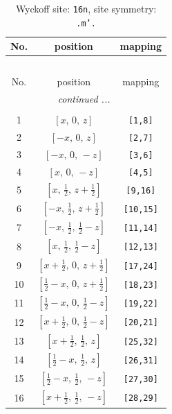 \documentclass[fleqn,8pt]{jsarticle}
\begin{document}
\renewcommand{\arraystretch}{1.2}
\begin{longtable}{ccc}
\caption{Wyckoff site: {\tt 16n}, site symmetry: {\tt .m'.}}
 \\
 \hline \hline
No. & position & mapping \\ \hline \endfirsthead

\multicolumn{2}{l}{\tablename\ \thetable{}} \\
 \hline \hline
No. & position & mapping \\ \hline \endhead

 \hline \hline
\multicolumn{2}{r}{\footnotesize\it continued ...} \\ \endfoot

 \hline \hline
\multicolumn{2}{r}{} \\ \endlastfoot

1 & $\left[ x,\, 0,\, z \right]$ & {\tt [1,8]} \\ \hline
2 & $\left[ - x,\, 0,\, z \right]$ & {\tt [2,7]} \\ \hline
3 & $\left[ - x,\, 0,\, - z \right]$ & {\tt [3,6]} \\ \hline
4 & $\left[ x,\, 0,\, - z \right]$ & {\tt [4,5]} \\ \hline
5 & $\left[ x,\, \frac{1}{2},\, z + \frac{1}{2} \right]$ & {\tt [9,16]} \\ \hline
6 & $\left[ - x,\, \frac{1}{2},\, z + \frac{1}{2} \right]$ & {\tt [10,15]} \\ \hline
7 & $\left[ - x,\, \frac{1}{2},\, \frac{1}{2} - z \right]$ & {\tt [11,14]} \\ \hline
8 & $\left[ x,\, \frac{1}{2},\, \frac{1}{2} - z \right]$ & {\tt [12,13]} \\ \hline
9 & $\left[ x + \frac{1}{2},\, 0,\, z + \frac{1}{2} \right]$ & {\tt [17,24]} \\ \hline
10 & $\left[ \frac{1}{2} - x,\, 0,\, z + \frac{1}{2} \right]$ & {\tt [18,23]} \\ \hline
11 & $\left[ \frac{1}{2} - x,\, 0,\, \frac{1}{2} - z \right]$ & {\tt [19,22]} \\ \hline
12 & $\left[ x + \frac{1}{2},\, 0,\, \frac{1}{2} - z \right]$ & {\tt [20,21]} \\ \hline
13 & $\left[ x + \frac{1}{2},\, \frac{1}{2},\, z \right]$ & {\tt [25,32]} \\ \hline
14 & $\left[ \frac{1}{2} - x,\, \frac{1}{2},\, z \right]$ & {\tt [26,31]} \\ \hline
15 & $\left[ \frac{1}{2} - x,\, \frac{1}{2},\, - z \right]$ & {\tt [27,30]} \\ \hline
16 & $\left[ x + \frac{1}{2},\, \frac{1}{2},\, - z \right]$ & {\tt [28,29]} \\
\end{longtable}
\end{document}
